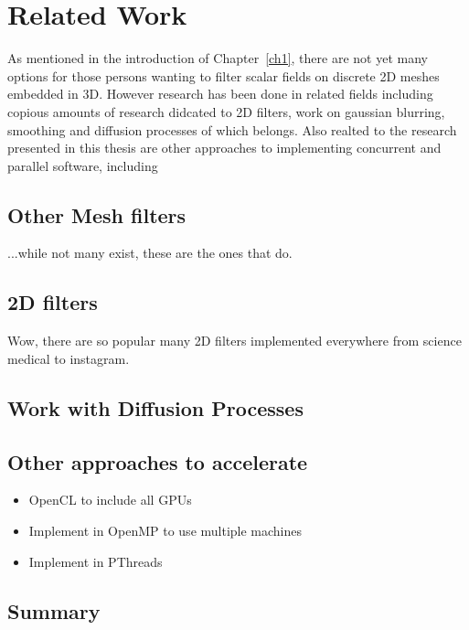 \chapter{Related Work}
As mentioned in the introduction of Chapter~\ref{ch1}, there are not yet many options for those persons wanting to filter scalar fields on discrete 2D meshes embedded in 3D. However research has been done in related fields including copious amounts of research didcated to 2D filters, work on gaussian blurring, smoothing and diffusion processes of which  belongs. Also realted to the research presented in this thesis are other approaches to implementing concurrent and parallel software, including 

%
%
%
%
%
\section{Other Mesh filters}
...while not many exist, these are the ones that do.

%
%
%
%
%
\section{2D filters}
Wow, there are so popular many 2D filters implemented everywhere from science medical to instagram.

%
%
%
%
%
\section{Work with Diffusion Processes}

%
%
%
%
%
\section{Other approaches to accelerate}
\begin{itemize}
	\item OpenCL to include all GPUs
	\item Implement in OpenMP to use multiple machines
	\item Implement in PThreads
\end{itemize}

%
%
%
%
%
\section{Summary}
%
